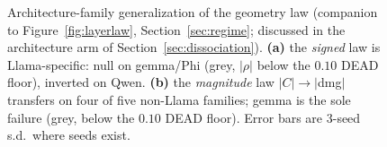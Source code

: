 \begin{figure}[t]
\centering

\caption{Architecture-family generalization of the geometry law (companion
to Figure~\ref{fig:layerlaw}, Section~\ref{sec:regime}; discussed in the
architecture arm of Section~\ref{sec:dissociation}). \textbf{(a)} the
\emph{signed} law is Llama-specific: null on gemma/Phi (grey, $|\rho|$ below
the $0.10$ DEAD floor), inverted on Qwen. \textbf{(b)} the \emph{magnitude}
law $|C|\!\to\!|$dmg$|$ transfers on four of five non-Llama families; gemma
is the sole failure (grey, below the $0.10$ DEAD floor). Error bars are
3-seed s.d.\ where seeds exist.}
\label{fig:crossarch}
\end{figure}
